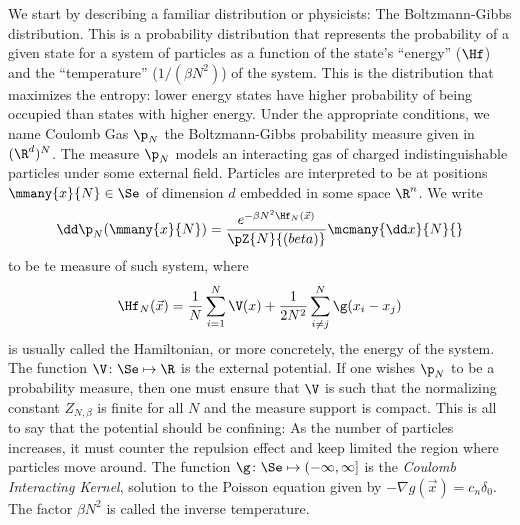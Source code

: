 We start by describing a familiar distribution or physicists: The Boltzmann-Gibbs distribution. This is a probability distribution that represents the probability of a given state for a system of particles as a function of the state's \enquote{energy} ($\Hf$) and the \enquote{temperature} ($1/(\beta N^2)$) of the system. This is the distribution that maximizes the entropy: lower energy states have higher probability of being occupied than states with higher energy. Under the appropriate conditions, we name Coulomb Gas $\p_N$ the Boltzmann-Gibbs probability measure given in $(\R^d)^N$. The measure $\p_N$ models an interacting gas of charged indistinguishable particles under some external field. Particles are interpreted to be at positions $\mmany{x}{N} \in \Se$ of dimension $d$ embedded in some space $\R^n$. We write  
\begin{equation}
	\dd \p_N(\mmany{x}{N}) = \frac{e^{-\beta N^2 \Hf_N(\vec{x})}}{\pZ{N}{(beta)}} \mcmany{\dd x}{N}{}
	\label{Equation: Coulomb Gas Measure}
\end{equation}
to be te measure of such system, where 
\begin{equation}
\Hf_N(\vec{x}) = \frac{1}{N} \sum_{i = 1}^{N} \V(x) + \frac{1}{2N^2} \sum_{i \neq j}^{N} \g(x_i - x_j)	
\end{equation}
is usually called the Hamiltonian, or more concretely, the energy of the system. The function $\V \colon \Se \mapsto \R$ is the external potential. If one wishes $\p_N$ to be a probability measure,  then one must ensure that $\V$ is such that the normalizing constant $Z_{N, \beta}$ is finite for all $N$ and the measure support is compact. This is all to say that the potential should be confining: As the number of particles increases, it must counter the repulsion effect and keep limited the region where particles move around. The function $\g \colon \Se \mapsto (-\infty, \infty]$ is the \textit{Coulomb Interacting Kernel}, solution to the Poisson equation given by $- \nabla g(\vec{x}) = c_n\delta_0$. The factor $\beta N^2$ is called the inverse temperature.

